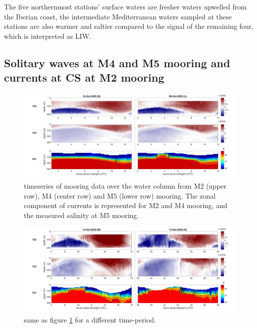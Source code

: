 The five northernmost stations' surface waters are fresher waters upwelled from the Iberian coast, the intermediate Mediterranean waters sampled at these stations are also warmer and saltier compared to the signal of the remaining four, which is interpreted as LIW.


\subsection{Solitary waves at M4 and M5 mooring and currents at CS at M2 mooring}
\label{section_obs_moor}

\begin{figure}[!h]
 \includegraphics[width=\textwidth]{./GBR3D/US_moorings1.png}
 \caption {timeseries of mooring data over the water column from M2 (upper row), M4 (center row) and M5 (lower row) mooring. The zonal component of currents is represented for M2 and M4 mooring, and the measured salinity at M5 mooring.}
 \label{fig_moor_US1}
\end{figure}

\begin{figure}[!h]
 \includegraphics[width=\textwidth]{./GBR3D/US_moorings2.png}
 \caption {same as figure \ref{fig_moor_US1} for a different time-period.}
 \label{fig_moor_US2}
\end{figure}

